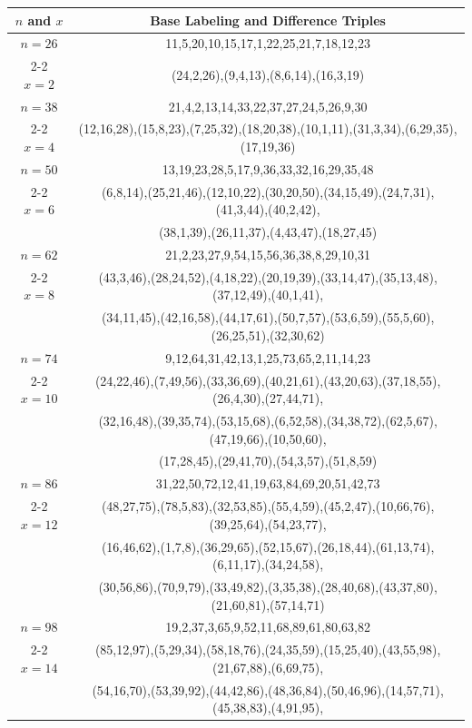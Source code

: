 \begin{tabular}{| c | c |}
\hline
\(n\) and \(x\) & Base Labeling and Difference Triples\\
\hline
\(n=26\) & 
11,5,20,10,15,17,1,22,25,21,7,18,12,23\\
\cline{2-2}
\(x=2\)
&(24,2,26),(9,4,13),(8,6,14),(16,3,19)\\
\hline 
\(n=38\) & 
21,4,2,13,14,33,22,37,27,24,5,26,9,30\\
\cline{2-2}
\(x=4\)
&(12,16,28),(15,8,23),(7,25,32),(18,20,38),(10,1,11),(31,3,34),(6,29,35),(17,19,36)\\
\hline 
\(n=50\) & 
13,19,23,28,5,17,9,36,33,32,16,29,35,48\\
\cline{2-2}
\(x=6\)
&(6,8,14),(25,21,46),(12,10,22),(30,20,50),(34,15,49),(24,7,31),(41,3,44),(40,2,42),\\
&(38,1,39),(26,11,37),(4,43,47),(18,27,45)\\
\hline 
\(n=62\) & 
21,2,23,27,9,54,15,56,36,38,8,29,10,31\\
\cline{2-2}
\(x=8\)
&(43,3,46),(28,24,52),(4,18,22),(20,19,39),(33,14,47),(35,13,48),(37,12,49),(40,1,41),\\
&(34,11,45),(42,16,58),(44,17,61),(50,7,57),(53,6,59),(55,5,60),(26,25,51),(32,30,62)\\
\hline 
\(n=74\) & 
9,12,64,31,42,13,1,25,73,65,2,11,14,23\\
\cline{2-2}
\(x=10\)
&(24,22,46),(7,49,56),(33,36,69),(40,21,61),(43,20,63),(37,18,55),(26,4,30),(27,44,71),\\
&(32,16,48),(39,35,74),(53,15,68),(6,52,58),(34,38,72),(62,5,67),(47,19,66),(10,50,60),\\
&(17,28,45),(29,41,70),(54,3,57),(51,8,59)\\
\hline 
\(n=86\) & 
31,22,50,72,12,41,19,63,84,69,20,51,42,73\\
\cline{2-2}
\(x=12\)
&(48,27,75),(78,5,83),(32,53,85),(55,4,59),(45,2,47),(10,66,76),(39,25,64),(54,23,77),\\
&(16,46,62),(1,7,8),(36,29,65),(52,15,67),(26,18,44),(61,13,74),(6,11,17),(34,24,58),\\
&(30,56,86),(70,9,79),(33,49,82),(3,35,38),(28,40,68),(43,37,80),(21,60,81),(57,14,71)\\
\hline 
\(n=98\) & 
19,2,37,3,65,9,52,11,68,89,61,80,63,82\\
\cline{2-2}
\(x=14\)
&(85,12,97),(5,29,34),(58,18,76),(24,35,59),(15,25,40),(43,55,98),(21,67,88),(6,69,75),\\
&(54,16,70),(53,39,92),(44,42,86),(48,36,84),(50,46,96),(14,57,71),(45,38,83),(4,91,95),\\

\end{tabular}
